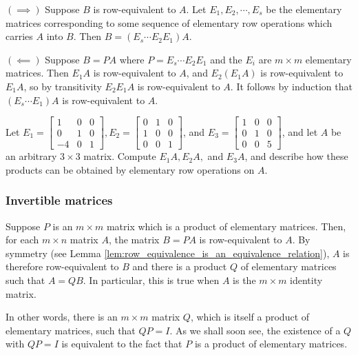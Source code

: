 \documentclass[12pt,letterpaper,reqno]{article}
\numberwithin{equation}{section}
\begin{document}
\begin{pf}
$(\implies)$ Suppose $B$ is row-equivalent to $A$. Let $E_1, E_2, \cdots, E_s$ be the elementary matrices corresponding to some sequence of elementary row operations which carries $A$ into $B$. Then $B=(E_s \cdots E_2 E_1)A$.

$(\impliedby)$ Suppose $B=PA$ where $P=E_s \cdots E_2E_1$ and the $E_i$ are $m \times m$ elementary matrices. Then $E_1 A$ is row-equivalent to $A$, and $E_2(E_1 A)$ is row-equivalent to $E_1 A$, so by transitivity $E_2E_1A$ is row-equivalent to $A$. It follows by induction that $(E_s \cdots E_1)A$ is row-equivalent to $A$.	
\end{pf}

\begin{exercise}
Let $E_1=\begin{bmatrix}
	1&0&0 \\ 0&1&0 \\ -4&0&1
\end{bmatrix}, E_2=\begin{bmatrix}
	0&1&0 \\ 1&0&0 \\ 0&0&1
\end{bmatrix}$, and $E_3=\begin{bmatrix}
	1&0&0 \\ 0&1&0 \\ 0&0&5
\end{bmatrix}$, and let $A$ be an arbitrary $3 \times 3$ matrix. Compute 
$E_1A, E_2A,$ and $E_3A$, and describe how these products can be obtained by elementary row operations on $A$.	
\end{exercise}

\subsubsection{Invertible matrices}
Suppose $P$ is an $m \times m$ matrix which is a product of elementary matrices. Then, for each $m \times n$ matrix $A$, the matrix $B=PA$ is row-equivalent to $A$. By symmetry (see Lemma \ref{lem:row_equivalence_is_an_equivalence_relation}), $A$ is therefore row-equivalent to $B$ and there is a product $Q$ of elementary matrices such that $A=QB$. In particular, this is true when $A$ is the $m \times m$ identity matrix. 

In other words, there is an $m \times m$ matrix $Q$, which is itself a product of elementary matrices, such that $QP=I$. As we shall soon see, the existence of a $Q$ with $QP=I$ is equivalent to the fact that $P$ is a product of elementary matrices.
\end{document}
